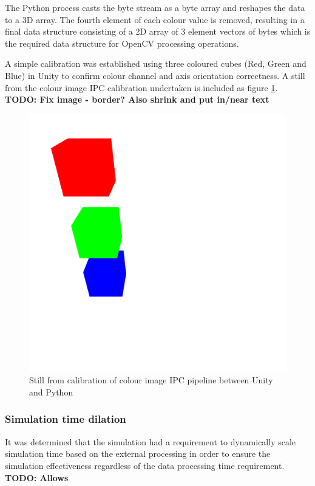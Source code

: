 \documentclass[]{aiaa-tc}%
\begin{document}
The Python process casts the byte stream as a byte array and reshapes the data to a 3D array. The fourth element of each colour value is removed, resulting in a final data structure consisting of a 2D array of 3 element vectors of bytes which is the required data structure for OpenCV processing operations. 

A simple calibration was established using three coloured cubes (Red, Green and Blue) in Unity to confirm colour channel and axis orientation correctness. A still from the colour image IPC calibration undertaken is included as figure \ref{f:unity_calibration}. \textbf{TODO: Fix image - border? Also shrink and put in/near text}

\begin{figure}[htb]%
 \includegraphics{unity_calibration.png}
 \caption{Still from calibration of colour image IPC pipeline between Unity and Python}
 \label{f:unity_calibration}
\end{figure}


\subsubsection{Simulation time dilation}\label{sect:timedilation}

It was determined that the simulation had a requirement to dynamically scale simulation time based on the external processing in order to ensure the simulation effectiveness regardless of the data processing time requirement. \textbf{TODO: Allows }
\end{document}
